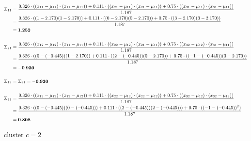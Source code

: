 \documentclass[12pt]{article}
\begin{document}
\begin{enumerate}
        \begin{equation*}
            \fontsize{9pt}{10pt}\selectfont
            \begin{aligned}
                \Sigma_{11} &= \frac{0.326 \cdot ((x_{11}-\mu_{11}) \cdot (x_{11} - \mu_{11}))+ 0.111 \cdot ((x_{21}-\mu_{11}) \cdot (x_{21} - \mu_{11}))+ 0.75 \cdot ((x_{31}-\mu_{11}) \cdot (x_{31} - \mu_{11}))}{1.187}\\
                &=\frac{0.326 \cdot ((1-2.170)(1-2.170)) + 0.111 \cdot ((0-2.170)(0-2.170))+ 0.75 \cdot ((3-2.170)(3-2.170))}{1.187} \\
                &= \mathbf{1.252}\\
                \\
                \Sigma_{21} &= \frac{0.326 \cdot ((x_{12}-\mu_{12}) \cdot (x_{11} - \mu_{11}))+ 0.111 \cdot ((x_{22}-\mu_{12}) \cdot (x_{21} - \mu_{11}))+ 0.75 \cdot ((x_{32}-\mu_{12}) \cdot (x_{31} - \mu_{11}))}{1.187}\\
                &=\frac{0.326 \cdot ((0-(-0.445))(1 - 2.170)) + 0.111 \cdot ((2-(-0.445))(0-2.170)) + 0.75 \cdot ((-1-(-0.445))(3-2.170))}{1.187} \\
                &= \mathbf{-0.930}\\
                \\
                \Sigma_{12} &= \Sigma_{21} = \mathbf{-0.930}\\
                \\
                \Sigma_{22} &= \frac{0.326 \cdot ((x_{12}-\mu_{12}) \cdot (x_{12} - \mu_{12}))+ 0.111 \cdot ((x_{22}-\mu_{12}) \cdot (x_{22} - \mu_{12}))+ 0.75 \cdot ((x_{32}-\mu_{12}) \cdot (x_{32} - \mu_{12}))}{1.187}\\
                &=\frac{0.326 \cdot ((0-(-0.445))(0-(-0.445))) + 0.111 \cdot ((2-(-0.445))(2-(-0.445))) + 0.75 \cdot ((-1-(-0.445))^2)}{1.187}\\
                &= \mathbf{0.808}\\
            \end{aligned}
        \end{equation*}

    \vspace{20pt}
     {cluster $c=2$}


\end{enumerate}
\end{document}
